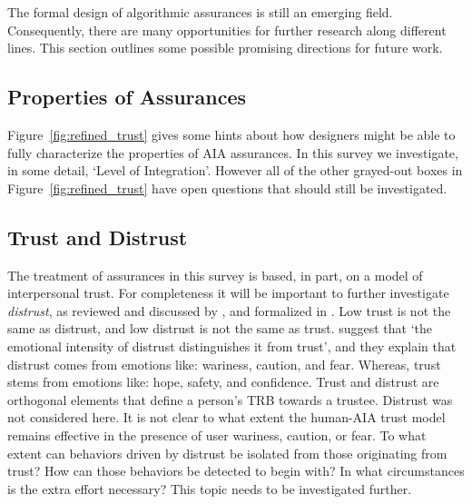 The formal design of algorithmic assurances is still an emerging field. Consequently, there are many opportunities for further research along different lines. This section outlines some possible promising directions for future work.

\subsection{Properties of Assurances} \label{sec:assurance_props_future}
 Figure~\ref{fig:refined_trust} gives some hints about how designers might be able to fully characterize the properties of AIA assurances. In this survey we investigate, in some detail, `Level of Integration'. However all of the other grayed-out boxes in Figure~\ref{fig:refined_trust} have open questions that should still be investigated. 









\subsection{Trust and Distrust}
The treatment of assurances in this survey is based, in part, on a model of interpersonal trust. For completeness it will be important to further investigate \textit{distrust}, as reviewed and discussed by \citet{Lewicki1998-ox}, and formalized in \citet{McKnight2001-gz}. Low trust is not the same as distrust, and low distrust is not the same as trust. \citet{McKnight2001-gz} suggest that `the emotional intensity of distrust distinguishes it from trust', and they explain that distrust comes from emotions like: wariness, caution, and fear. Whereas, trust stems from emotions like: hope, safety, and confidence. Trust and distrust are orthogonal elements that define a person's TRB towards a trustee. Distrust was not considered here. It is not clear to what extent the human-AIA trust model remains effective in the presence of user wariness, caution, or fear. To what extent can behaviors driven by distrust be isolated from those originating from trust? How can those behaviors be detected to begin with? In what circumstances is the extra effort necessary? This topic needs to be investigated further.

